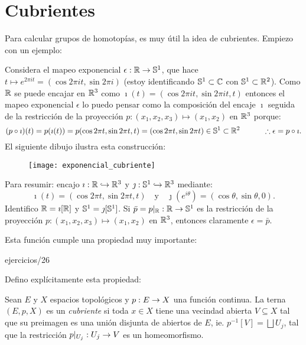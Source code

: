 \documentclass[../../topologia_algebraica]{subfiles}
\begin{document}
\section{Cubrientes}

Para calcular grupos de homotop\'ias, es muy \'util la idea de cubrientes. Empiezo con
un ejemplo:

Considera el mapeo exponencial $\epsilon:\mathbb{R}\rightarrow\mathbb{S}^1$, que hace
$t\mapsto e^{2\pi i t}=(\cos 2\pi i t,\sin2\pi i)$ (estoy identificando $\mathbb{S}^1\subset\mathbb{C}$ con
$\mathbb{S}^1\subset\mathbb{R}^2$).
Como $\mathbb{R}$ se puede encajar en $\mathbb{R}^3$ como $\imath(t)=(\cos 2\pi i t,\sin2\pi i t,t)$
entonces el mapeo exponencial $\epsilon$ lo puedo pensar como la composici\'on del encaje $\imath$
seguida de la restricci\'on de la proyecci\'on $p:(x_1,x_2,x_3)\mapsto (x_1,x_2)$ en $\mathbb{R}^3$ porque:
\[
  (p\circ\imath)(t)=
  p(\imath(t))=
  p(\cos 2\pi t,\sin2\pi t,t)=
  (\cos 2\pi t,\sin2\pi t)\in\mathbb{S}^1\subset\mathbb{R}^2 \qquad\quad
  \therefore \epsilon = p\circ\imath.
\]
El siguiente dibujo ilustra esta construcci\'on:
\begin{figure}[ht] %
  \centering
  \texttt{[image: exponencial\_cubriente]}
\end{figure} %


Para resumir: encajo $\imath:\mathbb{R}\hookrightarrow\mathbb{R}^3$ y $\jmath:\mathbb{S}^1\hookrightarrow\mathbb{R}^3$
mediante:
\[
  \imath(t)=(\cos 2\pi t,\sin2\pi t,t) \quad\text{y}\quad
  \jmath(e^{i\theta})=(\cos\theta,\sin\theta,0).
\]
Identifico $\mathbb{R}=\imath[\mathbb{R}]$ y $\mathbb{S}^1=\jmath[\mathbb{S}^1]$. Si $\bar{p}=p|_{\mathbb{R}}:\mathbb{R}\rightarrow\mathbb{S}^1$ es
la restricci\'on de la proyecci\'on $p:(x_1,x_2,x_3)\mapsto (x_1,x_2)$ en $\mathbb{R}^3$, entonces
claramente $\epsilon=\bar{p}$.

Esta funci\'on cumple una propiedad muy importante:

{ejercicios/26} %

Defino expl\'icitamente esta propiedad:

\begin{defin}
  Sean $E$ y $X$ espacios topol\'ogicos y $p:E\rightarrow X$ una funci\'on continua. La terna $(E,p,X)$
  es un \emph{cubriente} si toda $x\in X$ tiene una vecindad abierta $V\subseteq X$ tal que su
  preimagen es una uni\'on disjunta de abiertos de $E$, ie. $p^{-1}[V]=\bigsqcup U_j$, tal que
  la restricci\'on $p|_{U_j}:U_j\rightarrow V$ es un homeomorfismo.
\end{defin}
\end{document}
